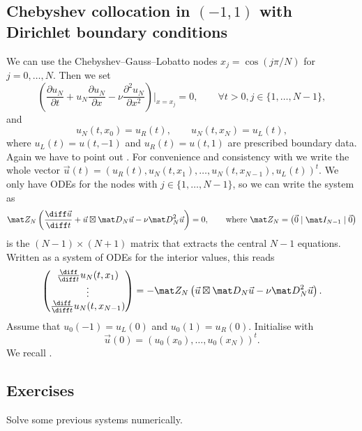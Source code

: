 \subsection{Chebyshev collocation in $(-1,1)$ with Dirichlet boundary conditions}
We can use the Chebyshev--Gauss--Lobatto nodes $x_j=\cos(j\pi/N)$ for $j = 0, \dots, N$. Then we set
\begin{equation*}
    \left( \frac{\partial u_N}{\partial t} + u_N \frac{\partial u_N}{\partial x} - \nu \frac{\partial^2 u_N}{\partial x^2} \right)\Bigg|_{x = x_j} = 0 , \qquad \forall t > 0, j \in \{1,\dots, N-1\},
\end{equation*}
and
\begin{equation*}
    u_N(t,x_0)=u_R(t), \qquad u_N(t,x_N)=u_L(t),
\end{equation*}
where $u_L(t)=u(t,-1)$ and $u_R(t)=u(t,1)$ are prescribed boundary data.
Again we have to point out .
For convenience and consistency with  we write the whole vector $\vec u (t) = (u_R(t), u_N(t,x_1),\dots,u_N(t,x_{N-1}),u_L(t))^t$.
We only have ODEs for the nodes with $j \in \{1, \dots, N-1\}$, so we can write the system as
\begin{equation*}
    \mat Z_N
    \left(     \frac{\diff \vec u}{\diff t} + \vec u \boxtimes  {\mat D}_N \vec u - \nu  {\mat D}^2_N \vec u
    \right) = 0, \qquad \text{where } \mat Z_N = \begin{pmatrix}
        \vec 0 \mid \mat I_{N-1} \mid \vec 0
    \end{pmatrix}
\end{equation*}
is the $(N-1) \times (N+1)$ matrix that extracts the central $N-1$ equations.
Written as a system of ODEs for the interior values, this reads
\begin{equation}
    \begin{pmatrix}
        \frac{\diff}{\diff t} u_N(t,x_1)     \\
        \vdots                    \\
        \frac{\diff}{\diff t} u_N(t,x_{N-1}) \\
    \end{pmatrix}
    = - \mat Z_N
    \left( \vec u \boxtimes  {\mat D}_N \vec u - \nu  {\mat D}^2_N \vec u \right).
\end{equation}
Assume that $u_0(-1)=u_L(0)$ and $u_0(1)=u_R(0)$. Initialise with
\begin{equation*}
    \vec u(0)=(u_0(x_0),\dots,u_0(x_N))^t.
\end{equation*}
We recall .

\subsection*{Exercises}
\begin{exercises}
\ex[] Solve some previous systems numerically.
\end{exercises}

\printbibliography[heading=subbibliography]
